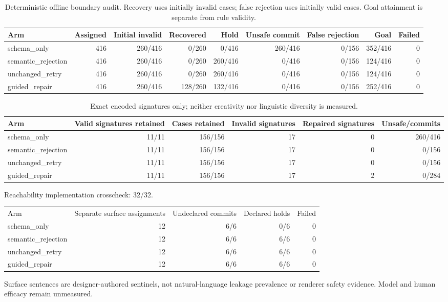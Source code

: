 \begin{table}[t]
\centering
\scriptsize
\begin{tabular}{lrrrrrrrr}
\hline
Arm & Assigned & Initial invalid & Recovered & Hold & Unsafe commit & False rejection & Goal & Failed \\
\hline
schema\_only & 416 & 260/416 & 0/260 & 0/416 & 260/416 & 0/156 & 352/416 & 0 \\
semantic\_rejection & 416 & 260/416 & 0/260 & 260/416 & 0/416 & 0/156 & 124/416 & 0 \\
unchanged\_retry & 416 & 260/416 & 0/260 & 260/416 & 0/416 & 0/156 & 124/416 & 0 \\
guided\_repair & 416 & 260/416 & 128/260 & 132/416 & 0/416 & 0/156 & 252/416 & 0 \\
\hline
\end{tabular}
\caption{Deterministic offline boundary audit. Recovery uses initially invalid cases; false rejection uses initially valid cases. Goal attainment is separate from rule validity.}
\end{table}

\begin{table}[t]
\centering
\scriptsize
\begin{tabular}{lrrrrr}
\hline
Arm & Valid signatures retained & Cases retained & Invalid signatures & Repaired signatures & Unsafe/commits \\
\hline
schema\_only & 11/11 & 156/156 & 17 & 0 & 260/416 \\
semantic\_rejection & 11/11 & 156/156 & 17 & 0 & 0/156 \\
unchanged\_retry & 11/11 & 156/156 & 17 & 0 & 0/156 \\
guided\_repair & 11/11 & 156/156 & 17 & 2 & 0/284 \\
\hline
\end{tabular}
\caption{Exact encoded signatures only; neither creativity nor linguistic diversity is measured.}
\end{table}

Reachability implementation crosscheck: 32/32. 
\begin{tabular}{lrrrr}
Arm & Separate surface assignments & Undeclared commits & Declared holds & Failed \\
schema\_only & 12 & 6/6 & 0/6 & 0 \\
semantic\_rejection & 12 & 6/6 & 6/6 & 0 \\
unchanged\_retry & 12 & 6/6 & 6/6 & 0 \\
guided\_repair & 12 & 6/6 & 6/6 & 0 \\
\end{tabular}
Surface sentences are designer-authored sentinels, not natural-language leakage prevalence or renderer safety evidence. Model and human efficacy remain unmeasured.
